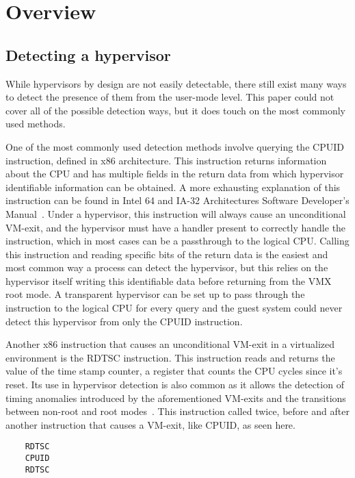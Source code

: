 \section{Overview}\label{s:overview}

\subsection{Detecting a hypervisor}\label{HV_detection}

While hypervisors by design are not easily detectable, there still exist many ways to detect the presence of them from the user-mode level. 
This paper could not cover all of the possible detection ways, but it does touch on the most commonly used methods.

One of the most commonly used detection methods involve querying the CPUID instruction, defined in x86 architecture. 
This instruction returns information about the CPU and has multiple fields in the return data from which hypervisor identifiable information can be obtained. 
A more exhausting explanation of this instruction can be found in Intel\textsuperscript{\tiny\textregistered} 64 and IA-32 Architectures Software Developer's Manual~\cite[Volume~2A]{Intel-SDM2025}. Under a hypervisor, 
this instruction will always cause an unconditional VM-exit, and the hypervisor must have a handler present to correctly handle the instruction, 
which in most cases can be a passthrough to the logical CPU. Calling this instruction and reading specific bits of the return data is the easiest 
and most common way a process can detect the hypervisor, but this relies on the hypervisor itself writing this identifiable data before returning from the VMX root mode. 
A transparent hypervisor can be set up to pass through the instruction to the logical CPU for every query and the guest system could never detect this hypervisor from only the CPUID instruction.

Another x86 instruction that causes an unconditional VM-exit in a virtualized environment is the RDTSC instruction. This instruction reads and returns the value of the time stamp counter, 
a register that counts the CPU cycles since it's reset. Its use in hypervisor detection is also common as it allows the detection of timing anomalies introduced by the aforementioned VM-exits 
and the transitions between non-root and root modes~\cite{hyperdbg-transparency}. This instruction called twice, before and after another instruction that causes a VM-exit, like CPUID, as seen here.
\begin{verbatim}
    RDTSC
    CPUID
    RDTSC
\end{verbatim}

